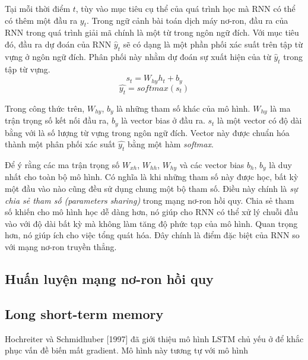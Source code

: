 Tại mỗi thời điểm $t$, tùy vào mục tiêu cụ thể của quá trình học mà RNN có thể có thêm một đầu ra $y_t$. Trong ngữ cảnh bài toán dịch máy nơ-ron, đầu ra của RNN trong quá trình giải mã chính là một từ trong ngôn ngữ đích. Với mục tiêu đó, đầu ra dự đoán của RNN $\hat{y}_t$ sẽ có dạng là một phần phối xác suất trên tập từ vựng ở ngôn ngữ đích. Phân phối này nhằm dự đoán sự xuất hiện của từ $\hat{y}_t$ trong tập từ vựng.
\begin{equation} \label{rnnOuputSoftmax}
	s_t = W_{hy}h_t + b_y
\end{equation}
\begin{equation} \label{rnnOuputSoftmaxDistribution}
	\hat{y_t} = softmax(s_t)
\end{equation}

Trong công thức trên, $W_{hy}$, $b_y$ là những tham số khác của mô hình. $W_{hy}$ là ma trận trọng số kết nối đầu ra, $b_y$ là vector bias ở đầu ra. $s_t$ là một vector có độ dài bằng với là số lượng từ vựng trong ngôn ngữ đích. Vector này được chuẩn hóa thành một phân phối xác suất $\hat{y_t}$ bằng một hàm \textit{softmax}.

Để ý rằng các ma trận trọng số $W_{xh}$, $W_{hh}$, $W_{hy}$ và các vector bias $b_h$, $b_y$ là duy nhất cho toàn bộ mô hình. Có nghĩa là khi những tham số này được học, bất kỳ một đầu vào nào cũng đều sử dụng chung một bộ tham số. Điều này chính là \textit{sự chia sẻ tham số (parameters sharing)} trong mạng nơ-ron hồi quy. Chia sẻ tham số khiến cho mô hình học dễ dàng hơn, nó giúp cho RNN có thể xử lý chuỗi đầu vào với độ dài bất kỳ mà không làm tăng độ phức tạp của mô hình. Quan trọng hơn, nó giúp ích cho việc tổng quát hóa. Đây chính là điểm đặc biệt của RNN so với mạng nơ-ron truyền thẳng.

\subsection{Huấn luyện mạng nơ-ron hồi quy}



\subsection{Long short-term memory}

Hochreiter và Schmidhuber [1997] đã giới thiệu mô hình LSTM chủ yếu ở để khắc phục vấn đề biến mất gradient. Mô hình này tương tự với mô hình 

